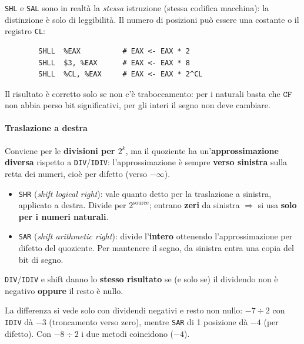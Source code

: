 \documentclass[11pt,a4paper]{article}
\begin{document}
\begin{integrazione}
\texttt{SHL} e \texttt{SAL} sono in realtà la \emph{stessa} istruzione (stessa codifica macchina): la distinzione è solo di leggibilità. Il numero di posizioni può essere una costante o il registro \texttt{CL}:
\begin{lstlisting}
        SHLL  %EAX          # EAX <- EAX * 2
        SHLL  $3, %EAX      # EAX <- EAX * 8
        SHLL  %CL, %EAX     # EAX <- EAX * 2^CL
\end{lstlisting}
Il risultato è corretto solo se non c'è traboccamento: per i naturali basta che $\texttt{CF}$ non abbia perso bit significativi, per gli interi il segno non deve cambiare.
\end{integrazione}

\paragraph*{Traslazione a destra}

Conviene per le \textbf{divisioni per $2^k$}, ma il quoziente ha un'\textbf{approssimazione diversa} rispetto a \texttt{DIV}/\texttt{IDIV}: l'approssimazione è sempre \textbf{verso sinistra} sulla retta dei numeri, cioè per difetto (verso $-\infty$).

\begin{itemize}[leftmargin=*]
  \item \texttt{SHR} (\emph{shift logical right}): vale quanto detto per la traslazione a sinistra, applicato a destra. Divide per $2^{\text{source}}$; entrano \textbf{zeri} da sinistra $\Rightarrow$ si usa \textbf{solo per i numeri naturali}.
  \item \texttt{SAR} (\emph{shift arithmetic right}): divide l'\textbf{intero} ottenendo l'approssimazione per difetto del quoziente. Per mantenere il segno, da sinistra entra una copia del bit di segno.
\end{itemize}

\begin{nota}
\texttt{DIV}/\texttt{IDIV} e shift danno lo \textbf{stesso risultato} se (e solo se) il dividendo non è negativo \textbf{oppure} il resto è nullo.
\end{nota}

\begin{integrazione}
La differenza si vede solo con dividendi negativi e resto non nullo: $-7 \div 2$ con \texttt{IDIV} dà $-3$ (troncamento verso zero), mentre \texttt{SAR} di 1 posizione dà $-4$ (per difetto). Con $-8 \div 2$ i due metodi coincidono ($-4$).
\end{integrazione}
\end{document}
